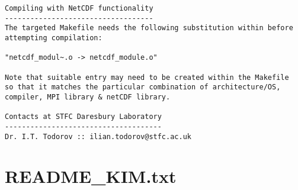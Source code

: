 \begin{verbatim}
Compiling with NetCDF functionality
-----------------------------------
The targeted Makefile needs the following substitution within before
attempting compilation:

"netcdf_modul~.o -> netcdf_module.o"

Note that suitable entry may need to be created within the Makefile
so that it matches the particular combination of architecture/OS,
compiler, MPI library & netCDF library.

Contacts at STFC Daresbury Laboratory
-------------------------------------
Dr. I.T. Todorov :: ilian.todorov@stfc.ac.uk
\end{verbatim}

\section{README\_KIM.txt}
